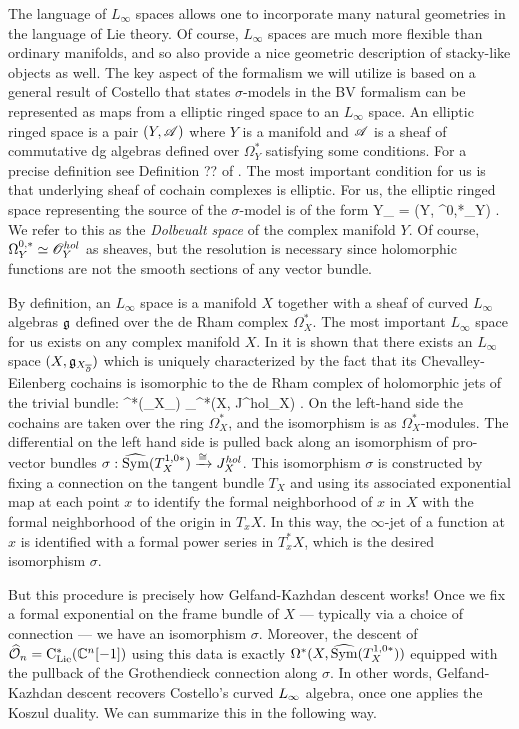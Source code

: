 \documentclass[10pt]{amsart}
\begin{document}
The language of $L_\infty$ spaces allows one to incorporate many natural geometries in the language of Lie theory.
Of course, $L_\infty$ spaces are much more flexible than ordinary manifolds, and so also provide a nice geometric description of stacky-like objects as well.
The key aspect of the formalism we will utilize is based on a general result of Costello \cite{CostelloHolomorphic, WG2} that states $\sigma$-models in the BV formalism can be represented as maps from a elliptic ringed space to an $L_\infty$ space.
An elliptic ringed space is a pair $(Y, \mathscr A)$ where $Y$ is a manifold and $\mathscr A$ is a sheaf of commutative dg algebras defined over $\Omega^*_Y$ satisfying some conditions. 
For a precise definition see Definition ?? of \cite{CostelloHolomorphic}.
The most important condition for us is that underlying sheaf of cochain complexes is elliptic.
For us, the elliptic ringed space representing the source of the $\sigma$-model is of the form
\ben
Y_{\dbar} = (Y, \Omega^{0,*}_Y) .
\een
We refer to this as the {\em Dolbeualt space} of the complex manifold $Y$. 
Of course, $\Omega^{0,*}_Y \simeq \mathscr O^{hol}_Y$ as sheaves, but the resolution is necessary since holomorphic functions are not the smooth sections of any vector bundle. 

By definition, an $L_\infty$ space is a manifold $X$ together with a sheaf of curved $L_\infty$ algebras $\mathfrak g$ defined over the de Rham complex $\Omega^*_X$. 
The most important $L_\infty$ space for us exists on any complex manifold $X$. 
In \cite{WG2} it is shown that there exists an $L_\infty$ space $(X, \mathfrak g_{X_{\overline{\partial}}})$ which is uniquely characterized by the fact that its Chevalley-Eilenberg cochains is isomorphic to the de Rham complex of holomorphic jets of the trivial bundle:
\ben
\clie^*(\fg_{X_{\dbar}}) \cong_\sigma \Omega^*(X, J^{hol}_X) .
\een
On the left-hand side the cochains are taken over the ring $\Omega^*_X$, and the isomorphism is as $\Omega^*_X$-modules.
The differential on the left hand side is pulled back along an isomorphism of pro-vector bundles 
$\sigma: \widehat{{\rm Sym}}(T^{1,0*}_X) \xrightarrow{\cong} J^{hol}_X$.
This isomorphism $\sigma$ is constructed by fixing a connection on the tangent bundle $T_X$
and using its associated exponential map at each point $x$ 
to identify the formal neighborhood of $x$ in $X$ with the formal neighborhood of the origin in $T_x X$.
In this way, the $\infty$-jet of a function at $x$ is identified with a formal power series in $T_x^* X$,
which is the desired isomorphism $\sigma$.

But this procedure is precisely how Gelfand-Kazhdan descent works! 
Once we fix a formal exponential on the frame bundle of $X$ --- typically via a choice of connection --- we have an isomorphism $\sigma$.
Moreover, the descent of $\widehat{\mathcal O}_n = {\rm C}_{{\rm Lie}}^*(\mathbb C^n[-1])$ using this data is exactly $\Omega^*(X, \widehat{{\rm Sym}}(T^{1,0*}_X))$
equipped with the pullback of the Grothendieck connection along $\sigma$.
In other words, Gelfand-Kazhdan descent recovers Costello's curved $\L8$ algebra,
once one applies the Koszul duality.
We can summarize this in the following way.
\end{document}

